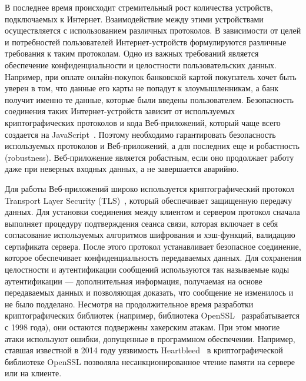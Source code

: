 В последнее время происходит стремительный рост количества устройств, подключаемых к Интернет. Взаимодействие между этими устройствами осуществляется с использованием различных протоколов. В зависимости от целей и потребностей пользователей Интернет-устройств формулируются различные требования к таким протоколам. Одно из важных требований является обеспечение конфиденциальности и целостности пользовательских данных. Например, при оплате онлайн-покупок банковской картой покупатель хочет быть уверен в том, что данные его карты не попадут к злоумышленникам, а банк получит именно те данные, которые были введены пользователем. Безопасность соединения таких Интернет-устройств зависит от используемых криптографических протоколов и кода Веб-приложений, который чаще всего создается на JavaScript~\cite{js_semantics}. Поэтому необходимо гарантировать безопасность используемых протоколов и Веб-приложений, а для последних еще и робастность (robustness). Веб-приложение является робастным, если оно продолжает работу даже при неверных входных данных, а не завершается аварийно. 

Для работы Веб-приложений широко используется криптографический протокол Transport Layer Security (TLS)~\cite{tls}, который обеспечивает защищенную передачу данных. Для установки соединения между клиентом и сервером протокол сначала выполняет процедуру подтверждения сеанса связи, которая включает в себя согласование используемых алгоритмов шифрования и хэш-функций, валидацию сертификата сервера. После этого протокол устанавливает безопасное соединение, которое обеспечивает конфиденциальность передаваемых данных. Для сохранения целостности и аутентификации сообщений используются так называемые коды аутентификации --- дополнительная  информация, получаемая на основе передаваемых данных и позволяющая доказать, что сообщение не изменилось и не было подделано. Несмотря на продолжительное время разработки криптографических библиотек (например, библиотека OpenSSL~\cite{openssl} разрабатывается с 1998 года), они остаются подвержены хакерским атакам. При этом многие атаки используют ошибки, допущенные в программном обеспечении. Например, ставшая известной в  2014 году уязвимость Heartbleed~\cite{heartbleed} в криптографической библиотеке OpenSSL позволяла несанкционированное чтение памяти на сервере или на клиенте.

